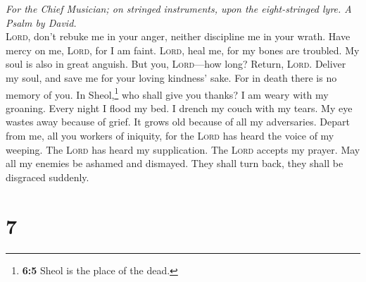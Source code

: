 \emph{For the Chief Musician; on stringed instruments, upon the
eight-stringed lyre. A Psalm by David.}\\
 \textsc{Lord}, don't rebuke me in your anger, neither
discipline me in your wrath.  Have mercy on me,
\textsc{Lord}, for I am faint. \textsc{Lord}, heal me, for my bones are
troubled.  My soul is also in great anguish. But you,
\textsc{Lord}---how long?  Return, \textsc{Lord}. Deliver
my soul, and save me for your loving kindness' sake.  For
in death there is no memory of you. In Sheol,\footnote{\textbf{6:5}
  Sheol is the place of the dead.} who shall give you thanks?
 I am weary with my groaning. Every night I flood my bed.
I drench my couch with my tears.  My eye wastes away
because of grief. It grows old because of all my adversaries.
 Depart from me, all you workers of iniquity, for the
\textsc{Lord} has heard the voice of my weeping.  The
\textsc{Lord} has heard my supplication. The \textsc{Lord} accepts my
prayer.  May all my enemies be ashamed and dismayed. They
shall turn back, they shall be disgraced suddenly.

\hypertarget{section-6}{%
\section{7}\label{section-6}}

